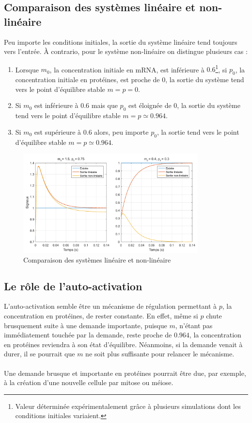 \documentclass[a4paper, 12pt]{article}
\begin{document}
	\subsection{Comparaison des systèmes linéaire et non-linéaire}
	Peu importe les conditions initiales, la sortie du système linéaire tend toujours vers l'entrée. \`{A} contrario, pour le système non-linéaire on distingue plusieurs cas :
	\begin{enumerate}
		\item Lorsque ${m}_{0}$, la concentration initiale en mRNA, est inférieure à $0.6$\footnote{Valeur déterminée expérimentalement grâce à plusieurs simulations dont les conditions initiales variaient.}, si ${p}_{0}$, la concentration initiale en protéines, est proche de $0$, la sortie du système tend vers le point d'équilibre stable $m = p = 0$.
		\item Si ${m}_{0}$ est inférieure à $0.6$ mais que ${p}_{0}$ est éloignée de $0$, la sortie du système tend vers le point d'équilibre stable $m = p \simeq 0.964$.
		\item Si ${m}_{0}$ est supérieure à $0.6$ alors, peu importe ${p}_{0}$, la sortie tend vers le point d'équilibre stable $m = p \simeq 0.964$.
	\end{enumerate}
	\begin{figure}[H]
		\centering
		\includegraphics[width = 0.85\textwidth]{resources/pdf/lvsnl.pdf}
		\caption{Comparaison des systèmes linéaire et non-linéaire}
	\end{figure}
	\subsection{Le rôle de l'auto-activation}
	L'auto-activation semble être un mécanisme de régulation permettant à $p$, la concentration en protéines, de rester constante. En effet, même si $p$ chute brusquement suite à une demande importante, puisque $m$, n'étant pas immédiatement touchée par la demande, reste proche de $0.964$, la concentration en protéines reviendra à son état d'équilibre. Néanmoins, si la demande venait à durer, il se pourrait que $m$ ne soit plus suffisante pour \og{} relancer \fg{} le mécanisme.\\\\
	Une demande brusque et importante en protéines pourrait être due, par exemple, à la création d'une nouvelle cellule par mitose ou méiose.
\end{document}
